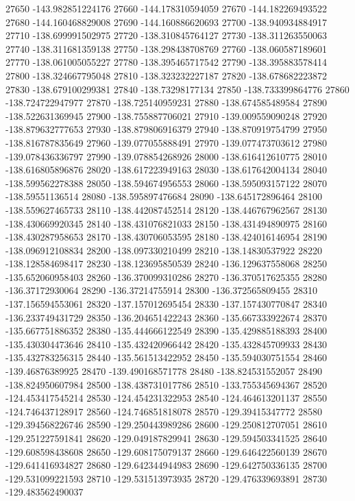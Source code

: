 {27650 -143.982851224176
27660 -144.178310594059
27670 -144.182269493522
27680 -144.160468829008
27690 -144.160886620693
27700 -138.940934884917
27710 -138.699991502975
27720 -138.310845764127
27730 -138.311263550063
27740 -138.311681359138
27750 -138.298438708769
27760 -138.060587189601
27770 -138.061005055227
27780 -138.395465717542
27790 -138.395883578414
27800 -138.324667795048
27810 -138.323232227187
27820 -138.678682223872
27830 -138.679100299381
27840 -138.73298177134
27850 -138.733399864776
27860 -138.724722947977
27870 -138.725140959231
27880 -138.674585489584
27890 -138.522631369945
27900 -138.755887706021
27910 -139.009559090248
27920 -138.879632777653
27930 -138.879806916379
27940 -138.870919754799
27950 -138.816787835649
27960 -139.077055888491
27970 -139.077473703612
27980 -139.078436336797
27990 -139.078854268926
28000 -138.616412610775
28010 -138.616805896876
28020 -138.617223949163
28030 -138.617642004134
28040 -138.599562278388
28050 -138.594674956553
28060 -138.595093157122
28070 -138.59551136514
28080 -138.595897476684
28090 -138.645172896464
28100 -138.559627465733
28110 -138.442087452514
28120 -138.446767962567
28130 -138.430669920345
28140 -138.431076821033
28150 -138.431494890975
28160 -138.430287958653
28170 -138.430706053595
28180 -138.424016146954
28190 -138.096912108834
28200 -138.097330210499
28210 -138.14830537922
28220 -138.128584698417
28230 -138.123695850539
28240 -136.129637558068
28250 -135.652060958403
28260 -136.370099310286
28270 -136.370517625355
28280 -136.37172930064
28290 -136.37214755914
28300 -136.372565809455
28310 -137.156594553061
28320 -137.157012695454
28330 -137.157430770847
28340 -136.233749431729
28350 -136.204651422243
28360 -135.667333922674
28370 -135.667751886352
28380 -135.444666122549
28390 -135.429885188393
28400 -135.430304473646
28410 -135.432420966442
28420 -135.432845709933
28430 -135.432783256315
28440 -135.561513422952
28450 -135.594030751554
28460 -139.46876389925
28470 -139.490168571778
28480 -138.824531552057
28490 -138.824950607984
28500 -138.438731017786
28510 -133.755345694367
28520 -124.453417545214
28530 -124.454231322953
28540 -124.464613201137
28550 -124.746437128917
28560 -124.746851818078
28570 -129.39415347772
28580 -129.394568226746
28590 -129.250443989286
28600 -129.250812707051
28610 -129.251227591841
28620 -129.049187829941
28630 -129.594503341525
28640 -129.608598438608
28650 -129.608175079137
28660 -129.646422560139
28670 -129.641416934827
28680 -129.642344944983
28690 -129.642750336135
28700 -129.531099221593
28710 -129.531513973935
28720 -129.476339693891
28730 -129.483562490037
}
